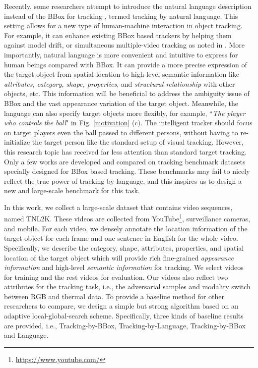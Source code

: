 \documentclass[final]{cvpr}
\begin{document}
Recently, some researchers attempt to introduce the natural language description instead of the BBox for tracking \cite{li2017tracking, wang2018describe, feng2019robust, yang2019grounding}, termed tracking by natural language. This setting allows for a new type of human-machine interaction in object tracking. For example, it can enhance existing BBox based trackers by helping them against model drift, or simultaneous multiple-video tracking as noted in \cite{li2017tracking}. More importantly, natural language is more convenient and intuitive to express for human beings compared with BBox. It can provide a more precise expression of the target object from spatial location to high-level semantic information like \emph{attributes, category, shape, properties}, and \emph{structural relationship} with other objects, etc. This information will be beneficial to address the ambiguity issue of BBox and the vast appearance variation of the target object. Meanwhile, the language can also specify target objects more flexibly, for example, ``\emph{The player who controls the ball}" in Fig. \ref{motivation} (c). The intelligent tracker should focus on target players even the ball passed to different persons, without having to re-initialize the target person like the standard setup of visual tracking. However, this research topic has received far less attention than standard target tracking. Only a few works \cite{li2017tracking, wang2018describe, feng2020langTrackwacv, feng2019robust, yang2019grounding} are developed and compared on tracking benchmark datasets specially designed for BBox based tracking. These benchmarks may fail to nicely reflect the true power of tracking-by-language, and this inspires us to design a new and large-scale benchmark for this task. 



In this work, we collect a large-scale dataset that contains  video sequences, named TNL2K. These videos are collected from YouTube\footnote{\url{https://www.youtube.com/}}, surveillance cameras, and mobile. For each video, we densely annotate the location information of the target object for each frame and one sentence in English for the whole video. Specifically, we describe the category, shape, attributes, properties, and spatial location of the target object which will provide rich fine-grained \emph{appearance information} and high-level \emph{semantic information} for tracking. We select  videos for training and the rest  videos for evaluation. Our videos also reflect two attributes for the tracking task, i.e., the adversarial samples and modality switch between RGB and thermal data. To provide a baseline method for other researchers to compare, we design a simple but strong algorithm based on an adaptive local-global-search scheme. Specifically, three kinds of baseline results are provided, i.e., Tracking-by-BBox, Tracking-by-Language, Tracking-by-BBox and Language. 
\end{document}
